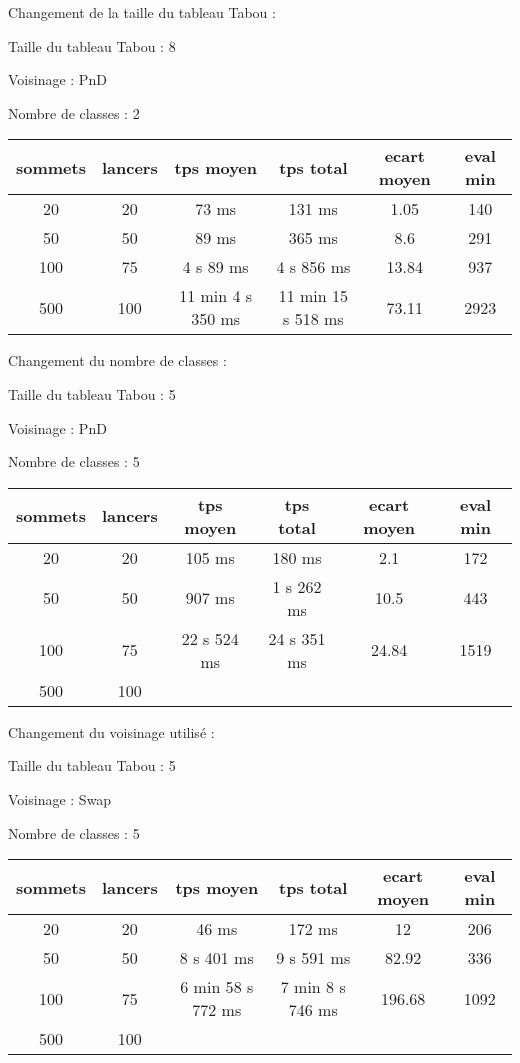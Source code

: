 \documentclass[12pt]{article}
\begin{document}
Changement de la taille du tableau Tabou :

Taille du tableau Tabou : 8

Voisinage : PnD

Nombre de classes : 2
\bigskip

\begin{tabular}{|c|c|c|c|c|c|}
	\hline 
	sommets & lancers & tps moyen & tps total & ecart moyen & eval min\\
	\hline
	20 & 20 & 73 ms & 131 ms & 1.05 & 140 \\
	\hline
	 50  &  50  &   89  ms   &  365  ms   &  8.6   &   291  \\
	\hline
	 100  &  75  &  4 s 89   ms   &  4 s  856  ms    &  13.84   &   937  \\
	\hline
	 500 & 100 & 11 min 4 s 350 ms & 11 min 15 s 518 ms & 73.11 & 2923 \\
	\hline
\end{tabular}
\bigskip

Changement du nombre de classes :

Taille du tableau Tabou : 5

Voisinage : PnD

Nombre de classes : 5
\bigskip

\begin{tabular}{|c|c|c|c|c|c|}
	\hline 
	sommets & lancers & tps moyen & tps total & ecart moyen & eval min\\
	\hline
	20 & 20 & 105 ms & 180 ms & 2.1 & 172 \\
	\hline
	 50  &  50  &   907  ms   &  1  s  262  ms   &   10.5  &   443  \\
	\hline
	 100  &  75  & 22 s 524  ms   &  24 s  351  ms    &  24.84   &   1519  \\
	\hline
	 500  &  100  &     &      &     &     \\
	\hline
\end{tabular}
\bigskip

Changement du voisinage utilisé :

Taille du tableau Tabou : 5

Voisinage : Swap

Nombre de classes : 5
\bigskip

\begin{tabular}{|c|c|c|c|c|c|}
	\hline 
	sommets & lancers & tps moyen & tps total & ecart moyen & eval min\\
	\hline
	20 & 20 & 46 ms & 172  ms & 12 & 206 \\
	\hline
	 50  &  50  &   8 s 401  ms   &  9  s 591   ms   &  82.92   &   336  \\
	\hline
	 100  &  75  & 6 min 58 s 772    ms  & 7 min 8 s 746   ms   &  196.68   &   1092 \\
	\hline
	 500  &  100  &    &   &   &  \\
	\hline
\end{tabular}
\end{document}
